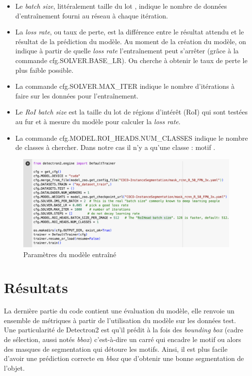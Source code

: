 \documentclass[a4paper, twoside, 12pt]{book}
\begin{document}
\begin{itemize}
    \item Le \textit{batch size}, littéralement \og taille du lot \fg, indique le nombre de données d'entraînement fourni au réseau à chaque itération. 
    \item La \textit{loss rate}, ou \og taux de perte\fg, est la différence entre le résultat attendu et le résultat de la prédiction du modèle. Au moment de la création du modèle, on indique à partir de quelle \textit{loss rate} l'entraînement peut s'arrêter (grâce à la commande cfg.SOLVER.BASE\_LR). On cherche à obtenir le taux de perte le plus faible possible. 
    \item La commande cfg.SOLVER.MAX\_ITER indique le nombre d'itérations à faire sur les données pour l'entraînement.
    \item Le \textit{RoI batch size} est la taille du lot de régions d'intérêt (RoI) qui sont testées au fur et à mesure du modèle pour calculer la \textit{loss rate}.
    \item La commande cfg.MODEL.ROI\_HEADS.NUM\_CLASSES indique le nombre de classes à chercher. Dans notre cas il n'y a qu'une classe : \og motif \fg.
\end{itemize}

\begin{figure}[!h]
    \centering
    \includegraphics[width=16cm]{images/paramDetectron2.png}
    \caption{Paramètres du modèle entraîné}
    \label{paramDetectron2} 
\end{figure}

\section{Résultats}

La dernière partie du code contient une évaluation du modèle, elle renvoie un ensemble de métriques à partir de l'utilisation du modèle sur les données test. Une particularité de Detectron2 est qu'il prédit à la fois des \textit{bounding box} (cadre de sélection, aussi notés \textit{bbox}) c'est-à-dire un carré qui encadre le motif ou alors des masques de segmentation qui détoure les motifs. Ainsi, il est plus facile d'avoir une prédiction correcte en \textit{bbox} que d'obtenir une bonne segmentation de l'objet. 
\end{document}
